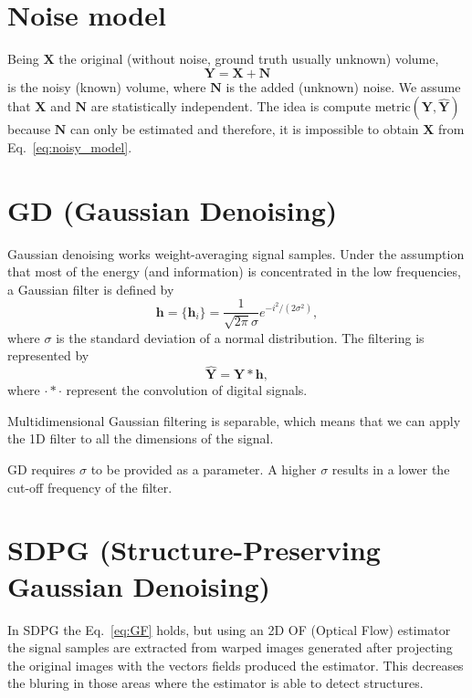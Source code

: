 \documentclass{article}
\begin{document}
\section{Noise model}

Being $\mathbf{X}$ the original (without noise, ground truth usually unknown) volume,
\begin{equation}
  \mathbf{Y} = \mathbf{X} + \mathbf{N}
  \label{eq:noisy_model}
\end{equation}
is the noisy (known) volume, where $\mathbf{N}$ is the added (unknown)
noise. We assume that $\mathbf{X}$ and $\mathbf{N}$ are statistically
independent. The idea is compute
$\text{metric}(\mathbf{Y}, \hat{\mathbf{Y}})$ because $\mathbf{N}$ can
only be estimated and therefore, it is impossible to obtain
$\mathbf{X}$ from Eq.~\ref{eq:noisy_model}.

\section{GD (Gaussian Denoising)}

Gaussian denoising works weight-averaging signal samples. Under the
assumption that most of the energy (and information) is concentrated
in the low frequencies, a Gaussian filter is defined by
\begin{equation}
  \mathbf{h} = \{\mathbf{h}_i\} = \frac{1}{\sqrt{2\pi}\sigma}e^{{-i}^2/(2\sigma^2)},
\end{equation}
where $\sigma$ is the standard deviation of a normal distribution. The
filtering is represented by
\begin{equation}
  \hat{\mathbf{Y}} = \mathbf{Y}*\mathbf{h},
  \label{eq:GF}
\end{equation}
where $\cdot*\cdot$ represent the convolution of digital signals.

Multidimensional Gaussian filtering is separable, which means that we
can apply the 1D filter to all the dimensions of the signal.

GD requires $\sigma$ to be provided as a parameter. A higher $\sigma$ results in a
lower the cut-off frequency of the filter.

\section{SDPG (Structure-Preserving Gaussian Denoising) \cite{gonzalez2023structure}}

In SDPG the Eq.~\ref{eq:GF} holds, but using an 2D OF (Optical Flow) estimator
the signal samples are extracted from warped images generated
after projecting the original images with the vectors fields produced
the estimator. This decreases the bluring in those areas where the
estimator is able to detect structures.
\end{document}
